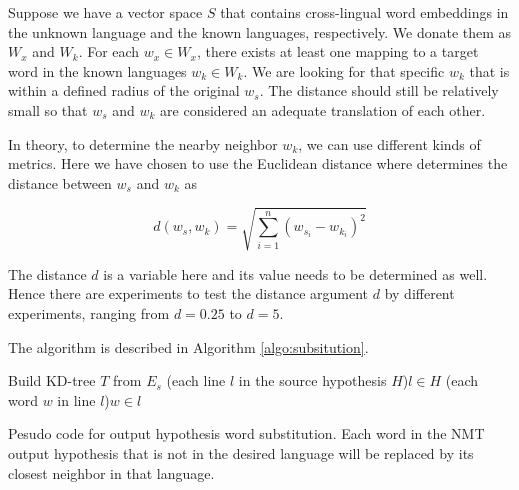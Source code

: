\documentclass[thesis,fonts=libertine]{cluu}
\begin{document}
Suppose we have a vector space $S$ that contains cross-lingual word embeddings in the unknown language and the known languages, respectively. We donate them as $W_x$ and $W_k$. For each $w_x\in W_x$, there exists at least one mapping to a target word in the known languages $w_k \in W_k$. We are looking for that specific $w_k$ that is within a defined radius of the original $w_s$. The distance should still be relatively small so that $w_s$ and $w_k$ are considered an adequate translation of each other.

In theory, to determine the nearby neighbor $w_k$, we can use different kinds of metrics. Here we have chosen to use the Euclidean distance where determines the distance between $w_s$ and $w_k$ as

\begin{equation}
  d(w_s, w_k)=\sqrt{\sum_{i=1}^n{(w_{s_i}-w_{k_i})}^2}
\end{equation}

The distance $d$ is a variable here and its value needs to be determined as well. Hence there are experiments to test the distance argument $d$ by different experiments, ranging from $d=0.25$ to $d=5$.

The algorithm is described in Algorithm \ref{algo:subsitution}.

\begin{algorithm}[h]
  \SetAlgoLined

  Build KD-tree $T$ from $E_s$
  \For(each line $l$ in the source hypothesis $H$){$l \in H$}{
    \For(each word $w$ in line $l$){$w \in l$}{
    }
  }
  \caption{Pesudo code for output hypothesis word substitution. Each word in the NMT output hypothesis that is not in the desired language will be replaced by its closest neighbor in that language.}
  \label{algo:subsitution}
\end{algorithm}
\end{document}
